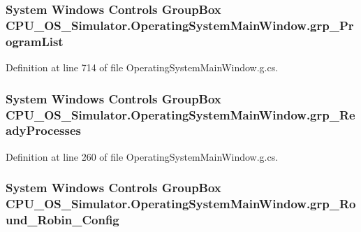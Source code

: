 \subsubsection[{grp\+\_\+\+Program\+List}]{\setlength{\rightskip}{0pt plus 5cm}System Windows Controls Group\+Box C\+P\+U\+\_\+\+O\+S\+\_\+\+Simulator.\+Operating\+System\+Main\+Window.\+grp\+\_\+\+Program\+List\hspace{0.3cm}{\ttfamily [package]}}\label{class_c_p_u___o_s___simulator_1_1_operating_system_main_window_a9dca0481c9d2ec99d42298352858be2b}


Definition at line 714 of file Operating\+System\+Main\+Window.\+g.\+cs.

\hypertarget{class_c_p_u___o_s___simulator_1_1_operating_system_main_window_ac76887fb899577a2695f5a16c32993c3}{}
\subsubsection[{grp\+\_\+\+Ready\+Processes}]{\setlength{\rightskip}{0pt plus 5cm}System Windows Controls Group\+Box C\+P\+U\+\_\+\+O\+S\+\_\+\+Simulator.\+Operating\+System\+Main\+Window.\+grp\+\_\+\+Ready\+Processes\hspace{0.3cm}{\ttfamily [package]}}\label{class_c_p_u___o_s___simulator_1_1_operating_system_main_window_ac76887fb899577a2695f5a16c32993c3}


Definition at line 260 of file Operating\+System\+Main\+Window.\+g.\+cs.

\hypertarget{class_c_p_u___o_s___simulator_1_1_operating_system_main_window_a1a5a0b0e438e5300a445ffe9ee3bf67d}{}
\subsubsection[{grp\+\_\+\+Round\+\_\+\+Robin\+\_\+\+Config}]{\setlength{\rightskip}{0pt plus 5cm}System Windows Controls Group\+Box C\+P\+U\+\_\+\+O\+S\+\_\+\+Simulator.\+Operating\+System\+Main\+Window.\+grp\+\_\+\+Round\+\_\+\+Robin\+\_\+\+Config\hspace{0.3cm}{\ttfamily [package]}}\label{class_c_p_u___o_s___simulator_1_1_operating_system_main_window_a1a5a0b0e438e5300a445ffe9ee3bf67d}


